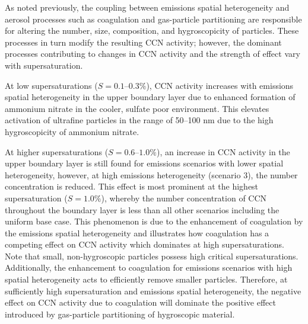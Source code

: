 \documentclass[journal abbreviation, manuscript]{copernicus}
\begin{document}
As noted previously, the coupling between emissions spatial heterogeneity and aerosol processes such as coagulation and gas-particle partitioning are responsible for altering the number, size, composition, and hygroscopicity of particles. These processes in turn modify the resulting CCN activity; however, the dominant processes contributing to changes in CCN activity and the strength of effect vary with supersaturation. 

At low supersaturations ($S=0.1\text{--}0.3\%$), CCN activity increases with emissions spatial heterogeneity in the upper boundary layer due to enhanced formation of ammonium nitrate in the cooler, sulfate poor environment. This elevates activation of ultrafine particles in the range of 50--100 nm due to the high hygroscopicity of ammonium nitrate. 

At higher supersaturations ($S=0.6\text{--}1.0\%$), an increase in CCN activity in the upper boundary layer is still found for emissions scenarios with lower spatial heterogeneity, however, at high emissions heterogeneity (scenario 3), the number concentration is reduced. This effect is most prominent at the highest supersaturation ($S=1.0\%$), whereby the number concentration of CCN throughout the boundary layer is less than all other scenarios including the uniform base case. This phenomenon is due to the enhancement of coagulation by the emissions spatial heterogeneity and illustrates how coagulation has a competing effect on CCN activity which dominates at high supersaturations. Note that small, non-hygroscopic particles possess high critical supersaturations. Additionally, the enhancement to coagulation for emissions scenarios with high spatial heterogeneity acts to efficiently remove smaller particles. Therefore, at sufficiently high supersaturation and emissions spatial heterogeneity, the negative effect on CCN activity due to coagulation will dominate the positive effect introduced by gas-particle partitioning of hygroscopic material. 
\end{document}
